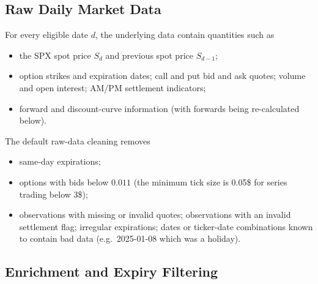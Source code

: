 \documentclass[11pt,a4paper]{article}
\begin{document}
\subsection{Raw Daily Market Data}

For every eligible date \(d\), the underlying data contain quantities such as
%
\begin{itemize}
    \item the SPX spot price \(S_d\) and previous spot price \(S_{d-1}\);
    \item option strikes and expiration dates; call and put bid and ask quotes; volume and open interest; AM/PM settlement indicators;
    \item forward and discount-curve information (with forwards being re-calculated below).
\end{itemize}

The default raw-data cleaning removes
%
\begin{itemize}
    \item same-day expirations;
    \item options with bids below \(0.011\) (the minimum tick size is 0.05\$ for series trading below 3\$);
    \item observations with missing or invalid quotes; observations with an invalid settlement flag; irregular expirations; dates or ticker-date combinations known to contain bad data (e.g.~2025-01-08 which was a holiday).
\end{itemize}

\subsection{Enrichment and Expiry Filtering}
\end{document}
